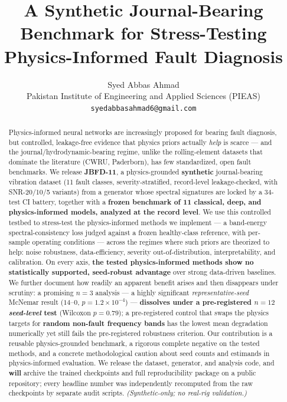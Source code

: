 \documentclass{article}
\title{A Synthetic Journal-Bearing Benchmark for Stress-Testing\\
       Physics-Informed Fault Diagnosis}
\author{%
  Syed Abbas Ahmad\\
  Pakistan Institute of Engineering and Applied Sciences (PIEAS)\\
  \texttt{syedabbasahmad6@gmail.com}%
}
\begin{document}
\maketitle

\begin{abstract}
Physics-informed neural networks are increasingly proposed for bearing fault
diagnosis, but controlled, leakage-free evidence that physics priors actually
\emph{help} is scarce --- and the journal/\allowbreak hydrodynamic-bearing
regime, unlike
the rolling-element datasets that dominate the literature (CWRU, Paderborn), has
few standardized, open fault benchmarks. We release \textbf{JBFD-11}, a physics-grounded
\textbf{synthetic} journal-bearing vibration dataset (11 fault classes,
severity-stratified, record-level leakage-checked, with SNR-20/10/5 variants)
from a generator whose spectral signatures are locked by a 34-test CI battery,
together with a \textbf{frozen benchmark of 11 classical, deep, and
physics-informed models, analyzed at the record level}. We use this controlled
testbed to stress-test the physics-informed methods we implement --- a
band-energy spectral-consistency loss judged against a frozen healthy-class
reference, with per-sample operating conditions --- across the regimes where
such priors are theorized to help: noise robustness, data-efficiency, severity
out-of-distribution, interpretability, and calibration. On every axis,
\textbf{the tested physics-informed methods show no statistically supported,
seed-robust advantage} over strong data-driven baselines. We further document
how readily an apparent benefit arises and then disappears under scrutiny: a
promising $n{=}3$ analysis --- a highly significant \emph{representative-seed}
McNemar result ($14$--$0$, $p=1.2\times10^{-4}$) --- \textbf{dissolves under a
pre-registered $n{=}12$ \emph{seed-level} test} (Wilcoxon $p=0.79$); a
pre-registered control that swaps the physics targets for \textbf{random
non-fault frequency bands} has the lowest mean degradation numerically yet still
fails the pre-registered robustness criterion. Our contribution is a reusable
physics-grounded benchmark, a rigorous complete negative on the tested methods,
and a concrete methodological caution about seed counts and estimands in
physics-informed evaluation. We release the dataset, generator, and analysis
code, and \textbf{will} archive the trained checkpoints and full reproducibility
package on a public repository; every headline number was independently
recomputed from the raw checkpoints by separate audit scripts.
\emph{(Synthetic-only; no real-rig validation.)}
\end{abstract}
\end{document}

